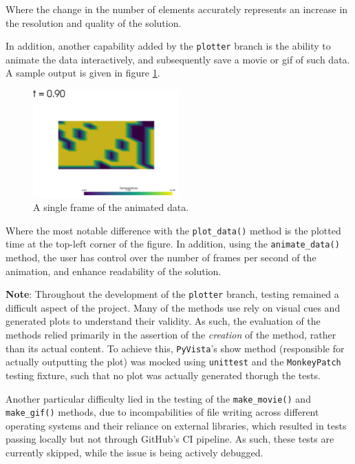 Where the change in the number of elements accurately represents an increase in the resolution and quality of the solution.

In addition, another capability added by the \texttt{plotter} branch is the ability to animate the data interactively, and subsequently save a movie or gif of such data. A sample output is given in figure \ref{fig:PyVistaAnimated}.

\begin{figure}[H]
    \centering
    \includegraphics[width=0.5\textwidth]{figures/PyVista_Animated.png}
    \caption{A single frame of the animated data.}
    \label{fig:PyVistaAnimated}
\end{figure}

Where the most notable difference with the \texttt{plot\_data()} method is the plotted time at the top-left corner of the figure. In addition, using the \texttt{animate\_data()} method, the user has control over the number of frames per second of the animation, and enhance readability of the solution.

\textbf{Note}: Throughout the development of the \texttt{plotter} branch, testing remained a difficult aspect of the project. Many of the methods use rely on visual cues and generated plots to understand their validity. As such, the evaluation of the methods relied primarily in the assertion of the \textit{creation} of the method, rather than its actual content. To achieve this, \texttt{PyVista}'s show method (responsible for actually outputting the plot) was mocked using \texttt{unittest} and the \texttt{MonkeyPatch} testing fixture, such that no plot was actually generated thorugh the tests.

Another particular difficulty lied in the testing of the \texttt{make\_movie()} and \texttt{make\_gif()} methods, due to incompabilities of file writing across different operating systems and their reliance on external libraries, which resulted in tests passing locally but not through GitHub's CI pipeline. As such, these tests are currently skipped, while the issue is being actively debugged.

